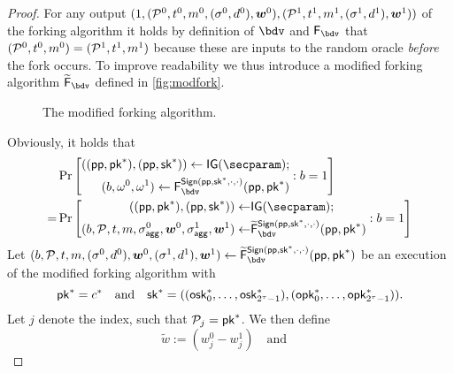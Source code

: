 \begin{proof}
  For any output $(1,(\mathcal{P}^0,t^0,m^0,(\sigma^0,d^0),\boldsymbol{w}^0),(\mathcal{P}^1,t^1,m^1,(\sigma^1,d^1),\boldsymbol{w}^1))$ of the forking algorithm it holds by definition of $\bdv$ and $\fork_\bdv$ that $(\mathcal{P}^0,t^0,m^0)=(\mathcal{P}^1,t^1,m^1)$ because these are inputs to the random oracle \emph{before} the fork occurs.
  To improve readability we thus introduce a modified forking algorithm $\widetilde\fork_\bdv$ defined in \autoref{fig:modfork}.
  \begin{figure}[tb]
  \centering
  \caption{The modified forking algorithm.}\label{fig:modfork}
  \end{figure}
  Obviously, it holds that
  \begin{align}
    &\Pr\left[\begin{aligned}((\params,\pk^*),(\params,\sk^*)) \gets \IG(\secparam);\\ (b,\omega^0,\omega^1)\gets \fork^{\sign(\params,\sk^*,\cdot,\cdot)}_\bdv(\params,\pk^*)\end{aligned} : b=1 \right]\nonumber\\
    =&\Pr\left[\begin{aligned}((\params,\pk^*),(\params,\sk^*)) \gets& \IG(\secparam);\\ (b,\pubkeys,t,m,\aggsig^0,\vec{w}^0,\aggsig^1,\vec{w}^1)\gets& \widetilde\fork^{\sign(\params,\sk^*,\cdot,\cdot)}_\bdv(\params,\pk^*)\end{aligned} : b=1 \right]\label{eq:forkprob}
  \end{align}
  Let $(b,\pubkeys,t,m,(\sigma^0,d^0),\vec{w}^0,(\sigma^1,d^1),\vec{w}^1) \gets \widetilde\fork_\bdv^{\sign(\params,\sk^*,\cdot,\cdot)}(\params,\pk^*)$ be an execution of the modified forking algorithm with \[\mathsf{pk}^* = c^*\quad\text{and}\quad\mathsf{sk}^* = ((\mathsf{osk}^*_0,\dots,\mathsf{osk}^*_{2^\tau-1}),(\mathsf{opk}^*_0,\dots,\mathsf{opk}^*_{2^\tau-1})).\]
  Let $j$ denote the index, such that $\mathcal{P}_j=\mathsf{pk}^*$.
  We then define \[\widetilde w := (w^0_j - w^1_j)\quad\text{and}\quad
\]
\end{proof}
